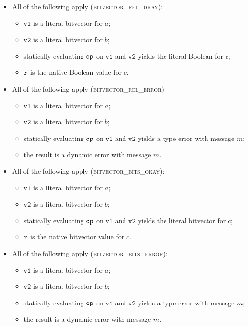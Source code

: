 \documentclass{book}
\newcommand\vvone[0]{\texttt{v1}}
\newcommand\vvtwo[0]{\texttt{v2}}
\begin{document}
\begin{itemize}
  \item All of the following apply (\textsc{bitvector\_rel\_okay}):
  \begin{itemize}
    \item $\vvone$ is a literal bitvector for $a$;
    \item $\vvtwo$ is a literal bitvector for $b$;
    \item statically evaluating $\texttt{op}$ on $\vvone$ and $\vvtwo$ yields the literal Boolean for $c$;
    \item $\texttt{r}$ is the native Boolean value for $c$.
  \end{itemize}

  \item All of the following apply (\textsc{bitvector\_rel\_error}):
  \begin{itemize}
    \item $\vvone$ is a literal bitvector for $a$;
    \item $\vvtwo$ is a literal bitvector for $b$;
    \item statically evaluating $\texttt{op}$ on $\vvone$ and $\vvtwo$ yields a type error with message $m$;
    \item the result is a dynamic error with message $m$.
  \end{itemize}

  \item All of the following apply (\textsc{bitvector\_bits\_okay}):
  \begin{itemize}
    \item $\vvone$ is a literal bitvector for $a$;
    \item $\vvtwo$ is a literal bitvector for $b$;
    \item statically evaluating $\texttt{op}$ on $\vvone$ and $\vvtwo$ yields the literal bitvector for $c$;
    \item $\texttt{r}$ is the native bitvector value for $c$.
  \end{itemize}

  \item All of the following apply (\textsc{bitvector\_bits\_error}):
  \begin{itemize}
    \item $\vvone$ is a literal bitvector for $a$;
    \item $\vvtwo$ is a literal bitvector for $b$;
    \item statically evaluating $\texttt{op}$ on $\vvone$ and $\vvtwo$ yields a type error with message $m$;
    \item the result is a dynamic error with message $m$.
  \end{itemize}
\end{itemize}
\end{document}
